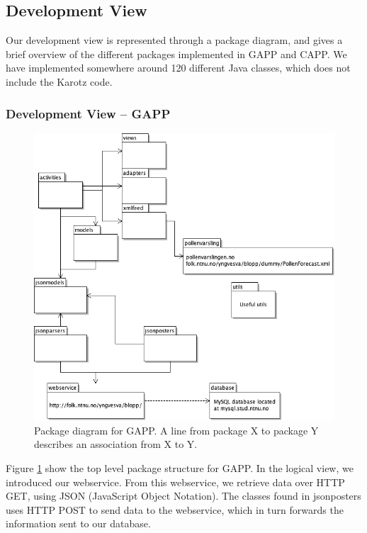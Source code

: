 \subsection{Development View}

Our development view is represented through a package diagram, and gives a brief overview of the different packages implemented in GAPP and CAPP. 
We have implemented somewhere around 120 different Java classes, which does not include the Karotz code. 

\subsubsection{Development View -- GAPP}
\label{sec:gapp-dev-view}

\begin{figure}
	\centering
		\includegraphics[width = 11.5 cm]{Pictures/ArchPictures/gapparchpictures/gapp_package_diagram.png}
	\caption[GAPP package diagram]{Package diagram for GAPP. A line from package X to package Y describes an association from X to Y. }
	\label{fig:package-diagram-gapp}
\end{figure}

Figure \ref{fig:package-diagram-gapp} show the top level package structure for GAPP. In the logical view, we introduced our webservice. 
From this webservice, we retrieve data over HTTP GET,
using JSON (JavaScript Object Notation). The classes found in jsonposters uses HTTP POST to send data to the webservice, which in turn forwards the information sent to our database. 


